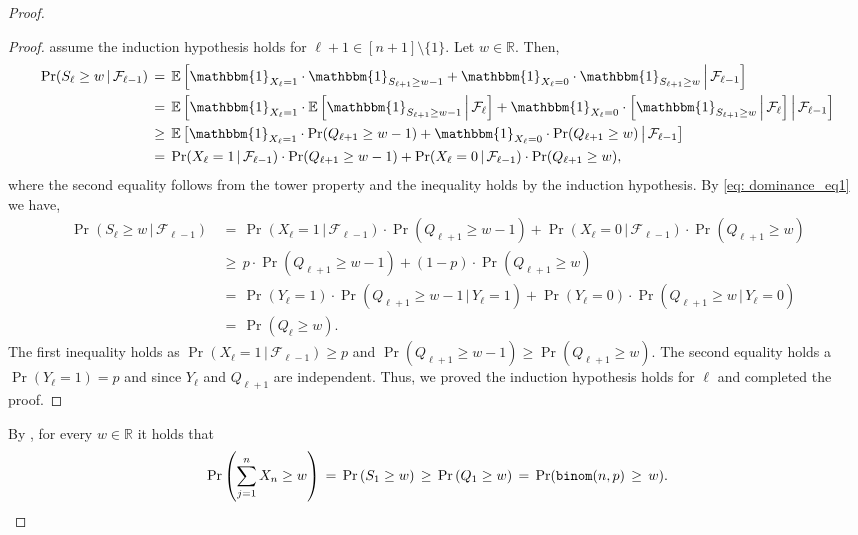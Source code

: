 \documentclass[letterpaper,11pt]{article}
\newenvironment{claimproof}{\begin{proof}\renewcommand{\qedsymbol}{$\lrcorner$}}{\end{proof}}
\newcommand{\cF}{\mathcal{F}}
\newcommand{\1}[1]{\mathds{1}\left[#1\right]}
\newcommand{\prbinom}{\textnormal{\texttt{binom}}}
\newcommand{\one}{\mathbbm{1}}
\newcommand{\E}{{\mathbb{E}}}
\begin{document}
\begin{proof}
\begin{claimproof}
 assume the induction hypothesis holds for $\ell+1\in [n+1]\setminus \{1\}$. Let $w\in \mathbb{R}$. Then,
\begin{equation}
	\label{eq: dominance_eq1}
\begin{aligned}
	\Pr(S_{\ell}\geq w\,|\,\cF_{\ell-1} ) \,&=\,\E \left[ \one_{X_{\ell}=1}\cdot \one_{S_{\ell+1} \geq w-1}+\one_{X_{\ell}=0}\cdot \one_{S_{\ell+1} \geq w}  \,\middle|\, \cF_{\ell-1} \right]\\
	&=\, \E \left[ \one_{X_{\ell}=1}\cdot \E\left[ \one_{S_{\ell+1} \geq w-1}\, \middle|\,\cF_{\ell} \right]+\one_{X_{\ell}=0}\cdot \left[ \one_{S_{\ell+1} \geq w}\,\middle|\,\cF_{\ell}\right]  \,\middle|\, \cF_{\ell-1} \right]\\
	&\geq \, \E \left[ \one_{X_{\ell}=1}\cdot \Pr(Q_{\ell+1} \geq w-1 )+\one_{X_{\ell}=0}\cdot \Pr(Q_{\ell+1}\geq w) \,\middle|\, \cF_{\ell-1} \right]\\
	&= \, \Pr(X_{\ell}=1\,|\,\cF_{\ell-1}) \cdot \Pr(Q_{\ell+1} \geq w-1 ) + \Pr(X_{\ell}=0\,|\,\cF_{\ell-1})\cdot \Pr(Q_{\ell+1} \geq w),
\end{aligned}
\end{equation}
where the second equality follows from the tower property and the inequality holds by the induction hypothesis.  By \eqref{eq: dominance_eq1} we have,
	\begin{equation*}
		\begin{aligned}
			\Pr(S_{\ell}\geq w\,|\,\cF_{\ell-1} ) \,
			&= \, \Pr(X_{\ell}=1\,|\,\cF_{\ell-1}) \cdot \Pr(Q_{\ell+1} \geq w-1 ) + \Pr(X_{\ell}=0\,|\,\cF_{\ell-1})\cdot \Pr(Q_{\ell+1} \geq w)\\
			&\geq\, p\cdot \Pr(Q_{\ell+1} \geq w-1 ) + (1-p)\cdot \Pr(Q_{\ell+1} \geq w) \\
			&=\, \Pr(Y_{\ell}=1) \cdot \Pr(Q_{\ell+1} \geq w-1 \,|\, Y_{\ell}=1) + \Pr(Y_{\ell}=0) \cdot \Pr(Q_{\ell+1} \geq w \,|\, Y_{\ell}=0)\\
			&=\, \Pr(Q_{\ell} \geq w).  
		\end{aligned}
	\end{equation*}
The first inequality holds as $\Pr(X_{\ell}=1\,|\,\cF_{\ell-1}) \geq p$ and $ \Pr(Q_{\ell+1} \geq w-1 ) \geq \Pr(Q_{\ell+1} \geq w)$. The second equality holds a $\Pr(Y_{\ell}=1)=p$ and since $Y_{\ell}$ and $Q_{\ell+1}$ are independent.  Thus, we proved the induction hypothesis holds for $\ell$ and completed the proof. 
\end{claimproof}
By , for every $w\in \mathbb{R}$ it holds that 
$$\Pr\left(\sum_{j=1}^n X_n \geq w \right)  \, =\, \Pr\left(S_1 \geq w\right)\, \geq \,  \Pr\left(Q_1 \geq w\right) \, =\, \Pr(\prbinom(n,p)\,\geq\, w). $$
 \end{proof}
\end{document}
